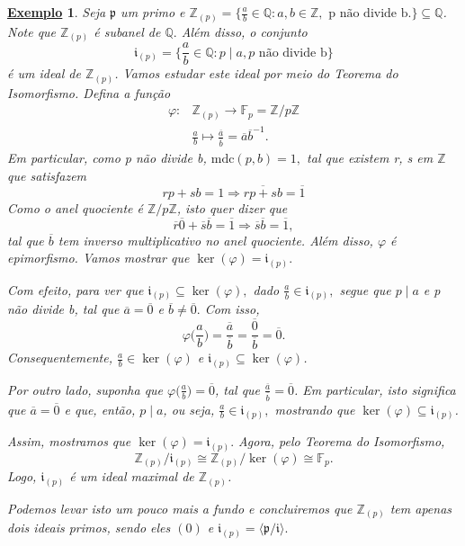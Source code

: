 \documentclass{article}
\newtheorem{example}{\underline{Exemplo}}
\begin{document}
 \begin{example}
 Seja \(\mathfrak{p}\) um primo e \(\mathbb{Z}_{(p)} = \biggl\{\frac{a}{b}\in \mathbb{Q}:a, b\in \mathbb{Z}, \text{ p não divide b.}\biggr\} \subseteq \mathbb{Q}\).
 Note que \(\mathbb{Z}_{(p)}\) é subanel de \(\mathbb{Q}.\) Além disso, o conjunto 
  \[
    \mathfrak{i}_{(p)}=\biggl\{\frac{a}{b}\in \mathbb{Q}: p\mid a, p \text{ não divide b}\biggr\}
  \]
  é um ideal de \(\mathbb{Z}_{(p)}\). Vamos estudar este ideal por meio do Teorema do Isomorfismo. Defina a função 
 \begin{align*}
  \varphi : &\mathbb{Z}_{(p)}\rightarrow \mathbb{F}_{p} = \mathbb{Z}/p \mathbb{Z}\\
            &\frac{a}{b}\mapsto \frac{\overline{a}}{\overline{b}} = \overline{a}\overline{b}^{-1}.
 \end{align*}
 Em particular, como p não divide b, \(\mathrm{mdc}(p, b) = 1,\) tal que existem r, s em \(\mathbb{Z}\) que satisfazem 
  \[
    rp + sb = 1 \Rightarrow \overline{rp + sb} = \overline{1}
  \]
  Como o anel quociente é \(\mathbb{Z}/p \mathbb{Z}\), isto quer dizer que 
  \[
    \overline{r}\overline{0} + \overline{s}\overline{b} = \overline{1} \Rightarrow \overline{s}\overline{b} = \overline{1},
  \]
  tal que \(\overline{b}\) tem inverso multiplicativo no anel quociente. Além disso, \(\varphi \) é epimorfismo. Vamos mostrar que 
 \(\ker{(\varphi )} = \mathfrak{i}_{(p)}.\) 

  Com efeito, para ver que \(\mathfrak{i}_{(p)}\subseteq \ker{(\varphi )},\) dado \(\frac{a}{b}\in \mathfrak{i}_{(p)},\) segue que \(p\mid a\) e p não divide b, tal que 
 \(\overline{a} = \overline{0}\) e \(\overline{b}\neq \overline{0}.\) Com isso, 
  \[
    \varphi \biggl(\frac{a}{b}\biggr) = \frac{\overline{a}}{\overline{b}} = \frac{\overline{0}}{\overline{b}} = \overline{0}.
  \]
  Consequentemente, \(\frac{a}{b}\in \ker{(\varphi )}\) e \(\mathfrak{i}_{(p)}\subseteq \ker{(\varphi )}\).

  Por outro lado, suponha que \(\varphi \biggl(\frac{a}{b}\biggr)=\overline{0}\), tal que \(\frac{\overline{a}}{\overline{b}} = \overline{0}\). Em particular, isto significa que 
  \(\overline{a} = \overline{0}\) e que, então, \(p\mid a\), ou seja, \(\frac{a}{b}\in \mathfrak{i}_{(p)},\) mostrando que \(\ker{(\varphi )}\subseteq \mathfrak{i}_(p)\).

  Assim, mostramos que \(\ker{(\varphi )} = \mathfrak{i}_{(p)}.\) Agora, pelo Teorema do Isomorfismo,
  \[
    \mathbb{Z}_{(p)}/\mathfrak{i}_{(p)} \cong{\mathbb{Z}_{(p)}/\ker{(\varphi )}} \cong{\mathbb{F}_{p}}.
  \]
  Logo, \(\mathfrak{i}_{(p)}\) é um ideal maximal de \(\mathbb{Z}_{(p)}\).

  Podemos levar isto um pouco mais a fundo e concluiremos que \(\mathbb{Z}_{(p)}\) tem apenas dois ideais primos, sendo eles \((0)\) e \(\mathfrak{i}_{(p)}=\langle \mathfrak{p}/\mathfrak{i} \rangle.\)
 \end{example}
\end{document}
